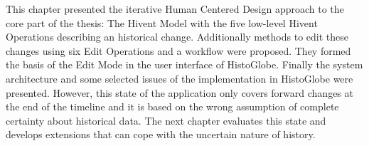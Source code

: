 

\vspace{2em}

This chapter presented the iterative Human Centered Design approach to the core part of the thesis: The Hivent Model with the five low-level Hivent Operations describing an historical change. Additionally methods to edit these changes using six Edit Operations and a workflow were proposed. They formed the basis of the Edit Mode in the user interface of HistoGlobe. Finally the system architecture and some selected issues of the implementation in HistoGlobe were presented. However, this state of the application only covers forward changes at the end of the timeline and it is based on the wrong assumption of complete certainty about historical data. The next chapter evaluates this state and develops extensions that can cope with the uncertain nature of history.
